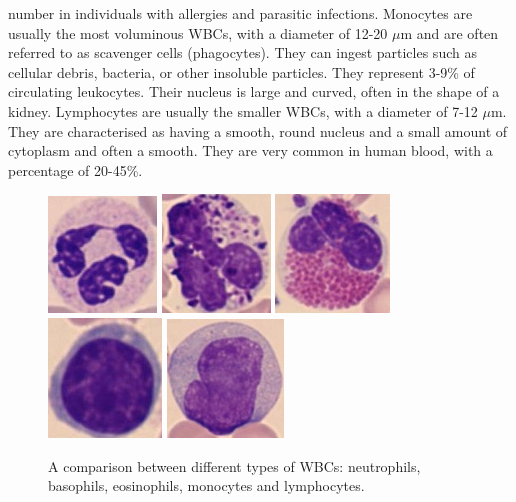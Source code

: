 \documentclass[final,a4paper,12pt,english]{UnicaPhdThesis3}
\begin{document}
number in individuals with allergies and parasitic infections. Monocytes are usually the most voluminous WBCs, with a diameter of 12-20 $\mu$m and are often referred to as scavenger cells (phagocytes). They can ingest particles such as cellular debris, bacteria, or other insoluble particles. They represent 3-9\% of circulating leukocytes. Their nucleus is large and curved, often in the shape of a kidney. Lymphocytes are usually the smaller WBCs, with a diameter of 7-12 $\mu$m. They are characterised as having a smooth, round nucleus and a small amount of cytoplasm and often a smooth. They are very common in human blood, with a percentage of 20-45\%. 
	
	\begin{figure}[!htbp]
		\centering
		\includegraphics[height=0.125\textheight]{images/crop-Fig2-1}
		\includegraphics[height=0.125\textheight]{images/crop-Fig2-2}
		\includegraphics[height=0.125\textheight]{images/crop-Fig2-3}
		\includegraphics[height=0.125\textheight]{images/crop-Fig2-4}
		\includegraphics[height=0.125\textheight]{images/crop-Fig2-5}
		\caption{\label{fig:leukocytes}A comparison between different types of WBCs: neutrophils, basophils, eosinophils, monocytes and lymphocytes.}
	\end{figure}
	
\end{document}
